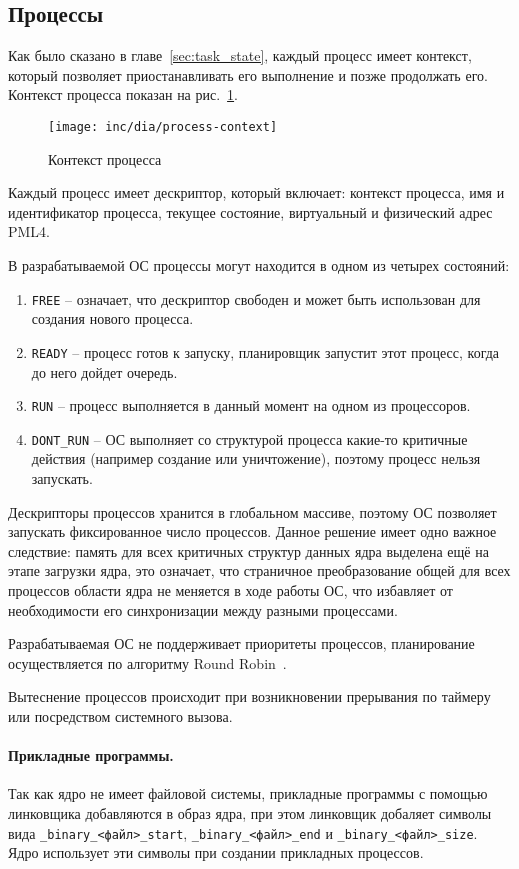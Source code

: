 \subsection{Процессы}
Как было сказано в главе~\ref{sec:task_state}, каждый процесс имеет контекст, который позволяет
приостанавливать его выполнение и позже продолжать его. Контекст процесса показан
на рис.~\ref{fig:process-context}.

\begin{figure}[ht!]
  \centering
  \texttt{[image: inc/dia/process-context]}
  \caption{Контекст процесса}
  \label{fig:process-context}
\end{figure}

Каждый процесс имеет дескриптор, который включает: контекст процесса, имя и идентификатор процесса,
текущее состояние, виртуальный и физический адрес PML4.

В разрабатываемой ОС процессы могут находится в одном из четырех состояний:
\begin{enumerate}[1.]
\item \texttt{FREE} -- означает, что дескриптор свободен и может быть использован
	для создания нового процесса.
\item \texttt{READY} -- процесс готов к запуску, планировщик запустит этот процесс,
	когда до него дойдет очередь.
\item \texttt{RUN} -- процесс выполняется в данный момент на одном из процессоров.
\item \texttt{DONT\_RUN} -- ОС выполняет со структурой процесса какие-то критичные действия
	(например создание или уничтожение), поэтому процесс нельзя запускать.
\end{enumerate}

Дескрипторы процессов хранится в глобальном массиве, поэтому ОС позволяет запускать
фиксированное число процессов. Данное решение имеет одно важное следствие: память
для всех критичных структур данных ядра выделена ещё на этапе загрузки ядра, это
означает, что страничное преобразование общей для всех процессов области ядра не
меняется в ходе работы ОС, что избавляет от необходимости его синхронизации
между разными процессами.

Разрабатываемая ОС не поддерживает приоритеты процессов, планирование осуществляется
по алгоритму Round Robin~\cite{tanenbaum}.

Вытеснение процессов происходит при возникновении прерывания по таймеру или посредством
системного вызова.

\paragraph{Прикладные программы.} Так как ядро не имеет файловой системы, прикладные
программы с помощью линковщика добавляются в образ ядра, при этом линковщик добаляет
символы вида \texttt{\_binary\_<файл>\_start}, \texttt{\_binary\_<файл>\_end} и
\texttt{\_binary\_<файл>\_size}. Ядро использует эти символы при создании прикладных процессов.

